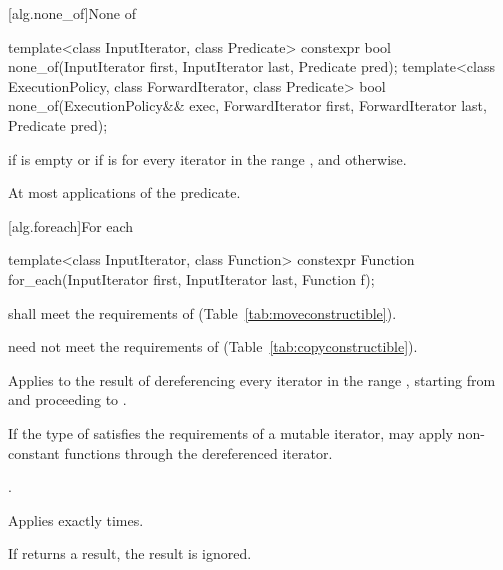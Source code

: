 [alg.none_of]{None of}

%
\begin{itemdecl}
template<class InputIterator, class Predicate>
  constexpr bool none_of(InputIterator first, InputIterator last, Predicate pred);
template<class ExecutionPolicy, class ForwardIterator, class Predicate>
  bool none_of(ExecutionPolicy&& exec, ForwardIterator first, ForwardIterator last,
               Predicate pred);
\end{itemdecl}

\begin{itemdescr}
\pnum
\returns {} if
 is empty or if
 is  for every iterator  in the range , and  otherwise.

\pnum
\complexity At most  applications of the predicate.
\end{itemdescr}

[alg.foreach]{For each}

%
\begin{itemdecl}
template<class InputIterator, class Function>
  constexpr Function for_each(InputIterator first, InputIterator last, Function f);
\end{itemdecl}

\begin{itemdescr}
\pnum
\requires {} shall meet the requirements of
 (Table~\ref{tab:moveconstructible}).
\begin{note}  need not meet the requirements of
 (Table~\ref{tab:copyconstructible}). \end{note}

\pnum
\effects
Applies
 to the result of dereferencing every iterator in the range
,
starting from
and proceeding to
.
\begin{note} If the type of  satisfies the
requirements of a mutable iterator,  may apply non-constant
functions through the dereferenced iterator.\end{note}

\pnum
\returns
{}.

\pnum
\complexity
Applies 
exactly
times.

\pnum
\remarks
If  returns a result, the result is ignored.
\end{itemdescr}

